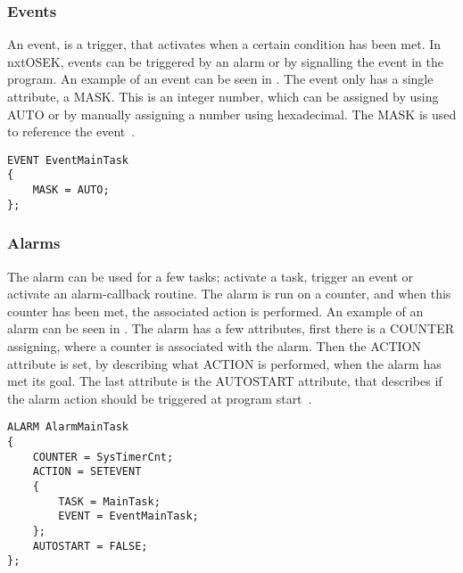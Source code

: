 \subsubsection{Events} \label{sec:events}
An event, is a trigger, that activates when a certain condition has been met. In nxtOSEK, events can be triggered by an alarm or by signalling the event in the program. An example of an event can be seen in . The event only has a single attribute, a MASK. This is an integer number, which can be assigned by using AUTO or by manually assigning a number using hexadecimal. The MASK is used to reference the event~\citep{osekoil}. 

\begin{lstlisting}[caption= An example of a task used in the \projname{}, label=lst:eventexample]
EVENT EventMainTask
{
    MASK = AUTO;
};
\end{lstlisting}


\subsubsection{Alarms} \label{sec:alarms}
The alarm can be used for a few tasks; activate a task, trigger an event or activate an alarm-callback routine. The alarm is run on a counter, and when this counter has been met, the associated action is performed. An example of an alarm can be seen in . The alarm has a few attributes, first there is a COUNTER assigning, where a counter is associated with the alarm. Then the ACTION attribute is set, by describing what ACTION is performed, when the alarm has met its goal. The last attribute is the AUTOSTART attribute, that describes if the alarm action should be triggered at program start~\citep{osekoil}.

\begin{lstlisting}[caption= An example of a task used in the \projname{}, label=lst:alarmexample]
ALARM AlarmMainTask
{
    COUNTER = SysTimerCnt;
    ACTION = SETEVENT
    {
        TASK = MainTask;
        EVENT = EventMainTask;
    };
    AUTOSTART = FALSE;
};
\end{lstlisting}

